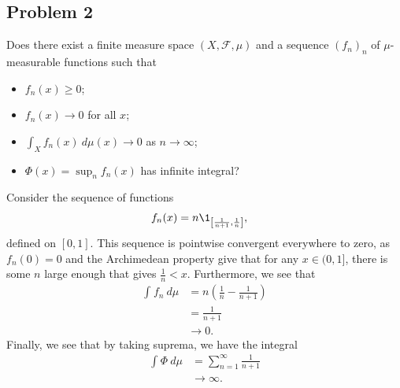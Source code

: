 \documentclass[10pt]{mypackage}
\begin{document}
\subsection{Problem 2}%
\begin{problem}
  Does there exist a finite measure space $\left( X,\mathcal{F},\mu \right)$ and a sequence $\left( f_n \right)_n$ of $\mu$-measurable functions such that
  \begin{itemize}
    \item $f_n(x) \geq 0$;
    \item $f_n(x)\rightarrow 0$ for all $x$;
    \item $ \int_{X}^{} f_n(x)\:d\mu(x) \rightarrow 0 $ as $n\rightarrow \infty$;
    \item $\Phi(x) = \sup_{n}f_n(x)$ has infinite integral?
  \end{itemize}
\end{problem}
Consider the sequence of functions
\begin{align*}
  f_n(x) &= n\1_{\left[ \frac{1}{n+1},\frac{1}{n} \right]},
\end{align*}
defined on $\left[ 0,1 \right]$. This sequence is pointwise convergent everywhere to zero, as $f_n(0) = 0$ and the Archimedean property give that for any $x\in (0,1]$, there is some $n$ large enough that gives $\frac{1}{n} < x$. Furthermore, we see that
\begin{align*}
  \int_{}^{} f_n\:d\mu &= n\left( \frac{1}{n}- \frac{1}{n+1} \right)\\
                       &= \frac{1}{n+1}\\
                       &\rightarrow 0.
\end{align*}
Finally, we see that by taking suprema, we have the integral
\begin{align*}
  \int_{}^{} \Phi\:d\mu &= \sum_{n=1}^{\infty}\frac{1}{n+1}\\
                        &\rightarrow \infty.
\end{align*}
\end{document}
